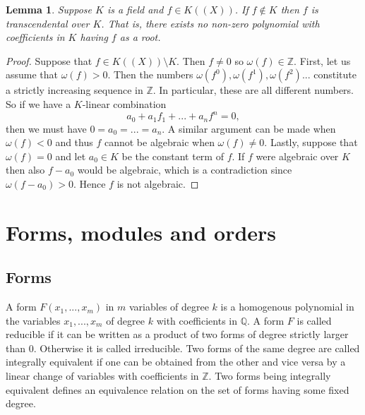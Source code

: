 \documentclass{article}
\newtheorem{lemma}{Lemma}[section]
\newcommand{\mbb}[1]{\mathbb{#1}}
\numberwithin{equation}{section}
\begin{document}
\begin{lemma}\label{lem: Unit power series is transcendental}
    Suppose $K$ is a field and $f \in K((X))$. If $f \notin K$ then $f$ is transcendental over $K$. That is, there exists no non-zero polynomial with coefficients in $K$ having $f$ as a root.
\end{lemma}
\begin{proof}
    Suppose that $f \in K((X)) \setminus K$. Then $f \neq 0$ so $\omega(f) \in \mbb Z$. First, let us assume that $\omega(f) > 0$. Then the numbers $\omega(f^0), \omega(f^1),\omega(f^2) ...$ constitute a strictly increasing sequence in $\mbb Z$. In particular, these are all different numbers. So if we have a $K$-linear combination
    $$a_0 + a_1 f_1 + ... + a_nf^n = 0,$$
    then we must have $0 = a_0 = ... = a_n$. A similar argument can be made when $\omega(f) < 0$ and thus $f$ cannot be algebraic when $\omega(f) \neq 0$. Lastly, suppose that $\omega(f) = 0$ and let $a_0 \in K$ be the constant term of $f$. If $f$ were algebraic over $K$ then also $f - a_0$ would be algebraic, which is a contradiction since $\omega(f - a_0) > 0$. Hence $f$ is not algebraic.
\end{proof}



\section{Forms, modules and orders}\label{sec: Forms and modules}
\subsection{Forms}
A form $F(x_1, ..., x_m)$ in $m$ variables of degree $k$ is a homogenous polynomial in the variables $x_1, ..., x_m$ of degree $k$ with coefficients in $\mbb{Q}$. A form $F$ is called reducible if it can be written as a product of two forms of degree strictly larger than 0. Otherwise it is called irreducible. Two forms of the same degree are called integrally equivalent if one can be obtained from the other and vice versa by a linear change of variables with coefficients in $\mbb{Z}$. Two forms being integrally equivalent defines an equivalence relation on the set of forms having some fixed degree.  
\end{document}

